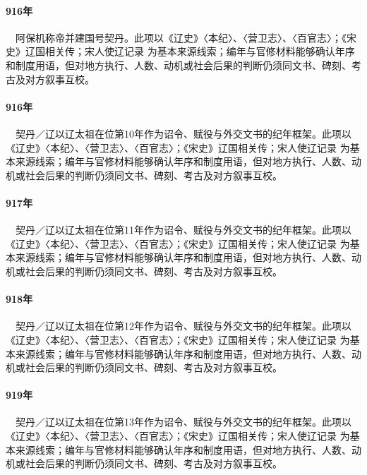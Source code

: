 \paragraph{916年}　阿保机称帝并建国号契丹。此项以《辽史》〈本纪〉、〈营卫志〉、〈百官志〉；《宋史》辽国相关传；宋人使辽记录 为基本来源线索；编年与官修材料能够确认年序和制度用语，但对地方执行、人数、动机或社会后果的判断仍须同文书、碑刻、考古及对方叙事互校。

\paragraph{916年}　契丹／辽以辽太祖在位第10年作为诏令、赋役与外交文书的纪年框架。此项以《辽史》〈本纪〉、〈营卫志〉、〈百官志〉；《宋史》辽国相关传；宋人使辽记录 为基本来源线索；编年与官修材料能够确认年序和制度用语，但对地方执行、人数、动机或社会后果的判断仍须同文书、碑刻、考古及对方叙事互校。

\paragraph{917年}　契丹／辽以辽太祖在位第11年作为诏令、赋役与外交文书的纪年框架。此项以《辽史》〈本纪〉、〈营卫志〉、〈百官志〉；《宋史》辽国相关传；宋人使辽记录 为基本来源线索；编年与官修材料能够确认年序和制度用语，但对地方执行、人数、动机或社会后果的判断仍须同文书、碑刻、考古及对方叙事互校。

\paragraph{918年}　契丹／辽以辽太祖在位第12年作为诏令、赋役与外交文书的纪年框架。此项以《辽史》〈本纪〉、〈营卫志〉、〈百官志〉；《宋史》辽国相关传；宋人使辽记录 为基本来源线索；编年与官修材料能够确认年序和制度用语，但对地方执行、人数、动机或社会后果的判断仍须同文书、碑刻、考古及对方叙事互校。

\paragraph{919年}　契丹／辽以辽太祖在位第13年作为诏令、赋役与外交文书的纪年框架。此项以《辽史》〈本纪〉、〈营卫志〉、〈百官志〉；《宋史》辽国相关传；宋人使辽记录 为基本来源线索；编年与官修材料能够确认年序和制度用语，但对地方执行、人数、动机或社会后果的判断仍须同文书、碑刻、考古及对方叙事互校。

